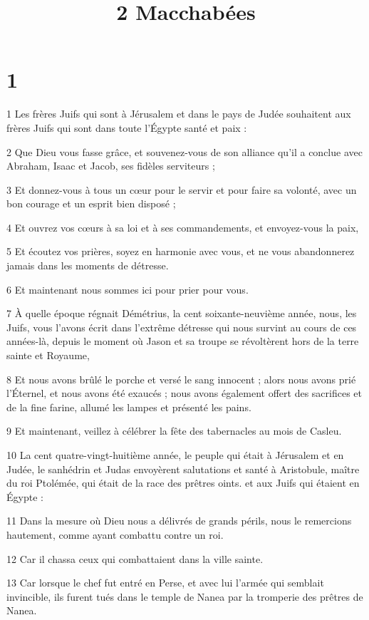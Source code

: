 

\title{2 Macchabées}


\chapter{1}

\par 1 Les frères Juifs qui sont à Jérusalem et dans le pays de Judée souhaitent aux frères Juifs qui sont dans toute l'Égypte santé et paix :
\par 2 Que Dieu vous fasse grâce, et souvenez-vous de son alliance qu'il a conclue avec Abraham, Isaac et Jacob, ses fidèles serviteurs ;
\par 3 Et donnez-vous à tous un cœur pour le servir et pour faire sa volonté, avec un bon courage et un esprit bien disposé ;
\par 4 Et ouvrez vos cœurs à sa loi et à ses commandements, et envoyez-vous la paix,
\par 5 Et écoutez vos prières, soyez en harmonie avec vous, et ne vous abandonnerez jamais dans les moments de détresse.
\par 6 Et maintenant nous sommes ici pour prier pour vous.
\par 7 À quelle époque régnait Démétrius, la cent soixante-neuvième année, nous, les Juifs, vous l'avons écrit dans l'extrême détresse qui nous survint au cours de ces années-là, depuis le moment où Jason et sa troupe se révoltèrent hors de la terre sainte et Royaume,
\par 8 Et nous avons brûlé le porche et versé le sang innocent ; alors nous avons prié l'Éternel, et nous avons été exaucés ; nous avons également offert des sacrifices et de la fine farine, allumé les lampes et présenté les pains.
\par 9 Et maintenant, veillez à célébrer la fête des tabernacles au mois de Casleu.
\par 10 La cent quatre-vingt-huitième année, le peuple qui était à Jérusalem et en Judée, le sanhédrin et Judas envoyèrent salutations et santé à Aristobule, maître du roi Ptolémée, qui était de la race des prêtres oints. et aux Juifs qui étaient en Égypte :
\par 11 Dans la mesure où Dieu nous a délivrés de grands périls, nous le remercions hautement, comme ayant combattu contre un roi.
\par 12 Car il chassa ceux qui combattaient dans la ville sainte.
\par 13 Car lorsque le chef fut entré en Perse, et avec lui l'armée qui semblait invincible, ils furent tués dans le temple de Nanea par la tromperie des prêtres de Nanea.
